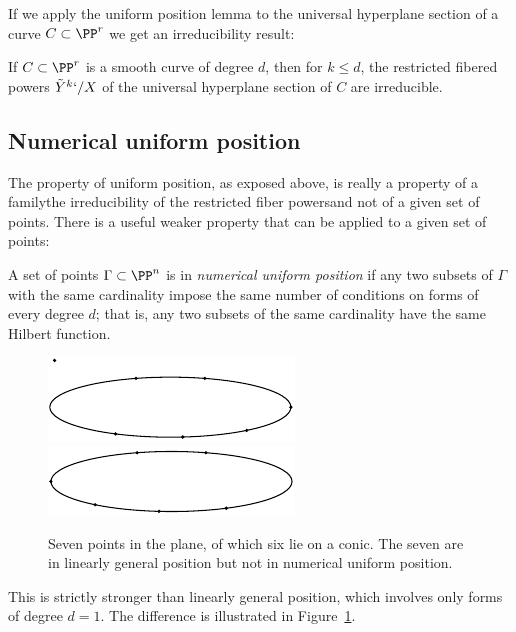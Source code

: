 If we apply the uniform position lemma to the universal hyperplane
section of a curve $C \subset \PP^r$ we get an irreducibility result:

\begin{corollary}\label{hyperplane section monodromy} If $C\subset \PP^r$
is a smooth curve of degree $d$, then
for $k\leq d$, the restricted fibered powers $\tilde Y^k`/X$  of the
universal hyperplane section
of $C$ are irreducible.
\end{corollary}

\subsection*{Numerical uniform position}

The property of uniform position, as exposed above, is really a property
of a family\emdash the irreducibility of the restricted
fiber powers\emdash and not of a given set of points. There is a useful
weaker property that
can be applied to a given set of points:

\begin{definition}
 A set of points $\Gamma\subset \PP^n$ is in \emph{numerical uniform
 position} if
 any two subsets of $\Gamma$ with the same cardinality impose the same
 number of conditions on forms of every degree $d$; that is, any two subsets
 of the same cardinality have the same Hilbert function.
%
\begin{figure}
\leavevmode
\vbox{\offinterlineskip
\hbox{\includegraphics[scale=1.3,viewport=-10 37 118 39,clip]{main/Fig10-2}}%
\hbox{\includegraphics[scale=1.3,viewport=0 0 118 33,clip]{main/Fig10-2a}}}
\caption{
Seven
points in the plane,
of which six lie
on a conic. The seven are in linearly general
position
but not
in numerical
uniform position.}
\label{numerical uniform is stronger}
\end{figure}
%

This is strictly stronger than linearly general position, which
involves only forms of degree $d=1$. The difference is illustrated
in Figure~\ref{numerical uniform is stronger}.
\end{definition}

